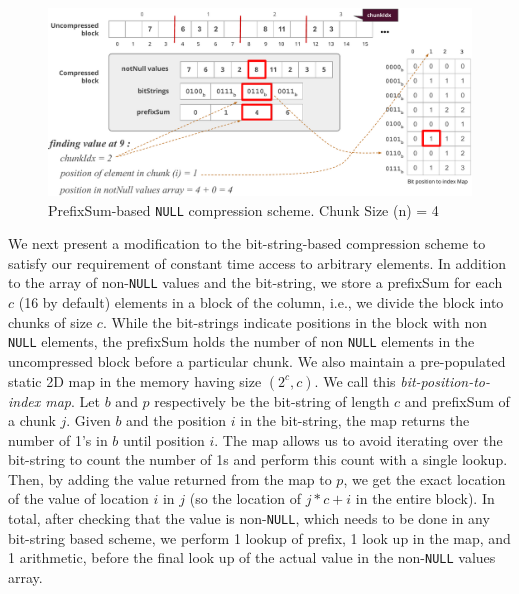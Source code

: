 
\begin{figure}
	\hfill\includegraphics[scale=0.70]{img/null2}\hspace*{\fill}
	\captionsetup{justification=centering}
	\caption{PrefixSum-based \texttt{NULL} compression scheme. Chunk Size (n) = 4}
	\label{fig:null2}
\end{figure}

We next present a modification to the bit-string-based compression scheme to satisfy our requirement of constant time access to arbitrary elements. In addition to the array of non-\texttt{NULL} values and the bit-string, we store a prefixSum for each $c$ (16 by default) elements in a block of the column, i.e., we divide the block into chunks of size $c$. While the bit-strings indicate positions in the block with non \texttt{NULL} elements, the prefixSum holds the number of non \texttt{NULL} elements in the uncompressed block before a particular chunk. We also maintain a pre-populated static 2D map in the memory having size $(2^c, c)$. We call this \emph{bit-position-to-index map}. Let $b$ and $p$ respectively be the bit-string of length $c$ and prefixSum of a chunk $j$. Given $b$ and the position $i$ in the bit-string, the map returns the number of 1's in $b$ until position $i$. The map  allows us to avoid iterating over the bit-string to count the number of 1s and perform this count with a single lookup. Then, by adding the value returned from the map to $p$, we get the exact location of the value of location $i$ in $j$ (so the location of $j*c + i$ in the entire block). In total, after checking that the value is non-\texttt{NULL}, which needs to be done in any bit-string based scheme, we perform 1 lookup of prefix, 1 look up in the map, and 1 arithmetic, before the final look up of the actual value in the non-\texttt{NULL} values array.

